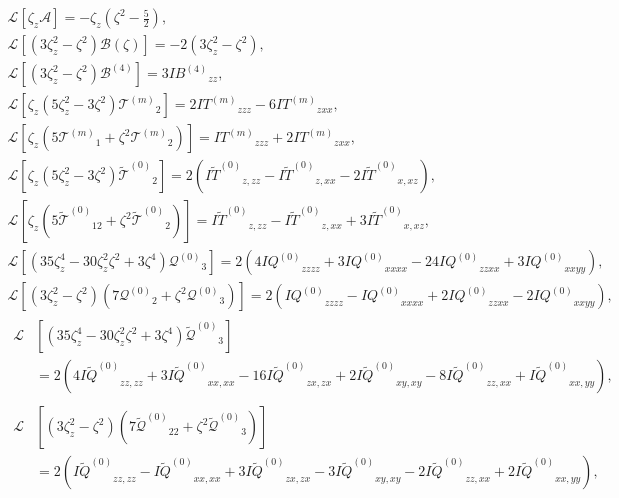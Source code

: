 \documentclass[review]{elsarticle}
\newcommand{\B}{\ensuremath{\mathcal{B}^{(4)}}}
\newcommand{\Q}{\ensuremath{\mathcal{Q}^{(0)}}}
\newcommand{\T}[1]{\ensuremath{\mathcal{T}^{(#1)}}}
\newcommand{\TT}{\ensuremath{\tilde{\mathcal{T}}^{(0)}}}
\newcommand{\QQ}{\ensuremath{\tilde{\mathcal{Q}}^{(0)}}}
\newcommand{\IF}[2][0]{\ensuremath{I{#2}^{(#1)}}}
\newcommand{\IFF}[1]{\ensuremath{I\tilde{#1}^{(0)}}}
\begin{document}
\begin{gather}
    \mathcal{L}\left[\zeta_z\mathcal{A}\right]
        = -\zeta_z\left(\zeta^2-\frac52\right), \label{eq:A}\\[6pt]
    \mathcal{L}\left[\left(3\zeta_z^2 - \zeta^2\right)\mathcal{B}(\zeta)\right]
        = -2\left(3\zeta_z^2 - \zeta^2\right), \label{eq:B}\\
    \mathcal{L}\left[\left(3\zeta_z^2 - \zeta^2\right)\B\right]
        = 3\IF[4]{B}_{zz}, \label{eq:B4}\\[6pt]
    \mathcal{L}\left[\zeta_z\left(5\zeta_z^2 - 3\zeta^2\right)\T{m}_2\right]
        = 2\IF[m]{T}_{zzz} - 6\IF[m]{T}_{zxx}, \label{eq:Tm1}\\
    \mathcal{L}\left[\zeta_z\left(5\T{m}_1 + \zeta^2\T{m}_2\right)\right]
        = \IF[m]{T}_{zzz} + 2\IF[m]{T}_{zxx}, \label{eq:Tm2}\\[6pt]
    \mathcal{L}\left[\zeta_z\left(5\zeta_z^2 - 3\zeta^2\right)\TT_2\right]
        = 2\left(\IFF{T}_{z,zz} - \IFF{T}_{z,xx} - 2\IFF{T}_{x,xz}\right), \label{eq:TT1}\\
    \mathcal{L}\left[\zeta_z\left(5\TT_{12} + \zeta^2\TT_2\right)\right]
        = \IFF{T}_{z,zz} - \IFF{T}_{z,xx} + 3\IFF{T}_{x,xz}, \label{eq:TT2}\\[6pt]
    \mathcal{L}\left[\left(35\zeta_z^4 - 30\zeta_z^2\zeta^2 + 3\zeta^4\right)\Q_3\right]
        = 2\left( 4\IF{Q}_{zzzz} + 3\IF{Q}_{xxxx} - 24\IF{Q}_{zzxx} + 3\IF{Q}_{xxyy} \right), \label{eq:Q1}\\
    \mathcal{L}\left[\left(3\zeta_z^2 - \zeta^2\right)\left(7\Q_2 + \zeta^2\Q_3\right)\right]
        = 2\left( \IF{Q}_{zzzz} - \IF{Q}_{xxxx} + 2\IF{Q}_{zzxx} - 2\IF{Q}_{xxyy} \right), \label{eq:Q2}\\[6pt]
    \begin{aligned}
    \mathcal{L}&\left[\left(35\zeta_z^4 - 30\zeta_z^2\zeta^2 + 3\zeta^4\right)\QQ_3\right] \\
        &= 2\left( 4\IFF{Q}_{zz,zz} + 3\IFF{Q}_{xx,xx} - 16\IFF{Q}_{zx,zx} + 2\IFF{Q}_{xy,xy} - 8\IFF{Q}_{zz,xx} + \IFF{Q}_{xx,yy} \right),
    \end{aligned}\label{eq:QQ1}\\
    \begin{aligned}
    \mathcal{L}&\left[\left(3\zeta_z^2 - \zeta^2\right)\left(7\QQ_{22} + \zeta^2\QQ_3\right)\right] \\
        &= 2\left( \IFF{Q}_{zz,zz} - \IFF{Q}_{xx,xx} + 3\IFF{Q}_{zx,zx} - 3\IFF{Q}_{xy,xy} - 2\IFF{Q}_{zz,xx} + 2\IFF{Q}_{xx,yy} \right),
    \end{aligned}\label{eq:QQ2}
\end{gather}
\end{document}
